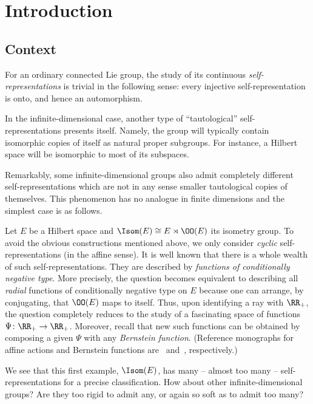 \section{Introduction}

\subsection{Context}

For an ordinary connected Lie group, the study of its continuous \emph{self-representations} is trivial in the following sense: every injective self-representation is onto, and hence an automorphism.

In the infinite-dimensional case, another type of ``tautological'' self-representations presents itself. Namely, the group will typically contain isomorphic copies of itself as natural proper subgroups. For instance, a Hilbert space will be isomorphic to most of its subspaces.

Remarkably, some infinite-dimensional groups also admit completely different self-representations which are not in any sense smaller tautological copies of themselves. This phenomenon has no analogue in finite dimensions and the simplest case is as follows.

Let $E$ be a Hilbert space and $\Isom(E)\cong E \rtimes \OO(E)$ its isometry group. To avoid the obvious constructions mentioned above, we only consider \emph{cyclic} self-representations (in the affine sense). It is well known that there is a whole wealth of such self-representations. They are described by \emph{functions of conditionally negative type}. More precisely, the question becomes equivalent to describing all \emph{radial} functions of conditionally negative type on $E$ because one can arrange, by conjugating, that $\OO(E)$ maps to itself. Thus, upon identifying a ray with $\RR_+$, the question completely reduces to the study of a fascinating space of functions $\Psi\colon \RR_+\to \RR_+$. Moreover, recall that new such functions can be obtained by composing a given $\Psi$ with any \emph{Bernstein function}. (Reference monographs for affine actions and Bernstein functions are~\cite{Bekka-Harpe-Valette} and~\cite{Schilling-Song-Vondracek_2}, respectively.)

We see that this first example, $\Isom(E)$, has many -- almost too many -- self-represen\-tations for a precise classification. How about other infinite-dimensional groups? Are they too rigid to admit any, or again so soft as to admit too many?


